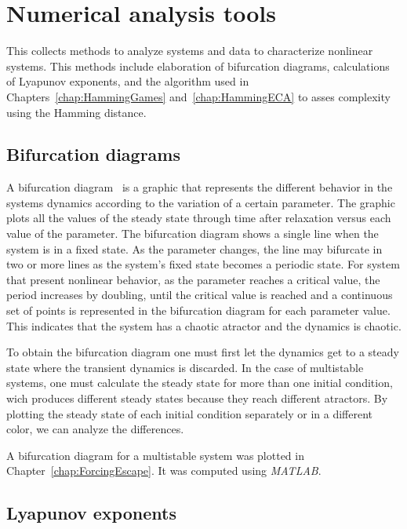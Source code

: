 \section{Numerical analysis tools}

This collects methods to analyze systems and data to characterize nonlinear systems. This methods include elaboration of bifurcation diagrams, calculations of Lyapunov exponents, and the algorithm used in Chapters~\ref{chap:HammingGames} and~\ref{chap:HammingECA} to asses complexity using the Hamming distance.

\subsection{Bifurcation diagrams}

A bifurcation diagram~\cite{Bifurcation} is a graphic that represents the different behavior in the systems dynamics according to the variation of a certain parameter. The graphic plots all the values of the steady state through time after relaxation versus each value of the parameter. The bifurcation diagram shows a single line when the system is in a fixed state. As the parameter changes, the line may bifurcate in two or more lines as the system's fixed state becomes a periodic state. For system that present nonlinear behavior, as the parameter reaches a critical value, the period increases by doubling, until the critical value is reached and a continuous set of points is represented in the bifurcation diagram for each parameter value. This indicates that the system has a chaotic atractor and the dynamics is chaotic.

To obtain the bifurcation diagram one must first let the dynamics get to a steady state where the transient dynamics is discarded. In the case of multistable systems, one must calculate the steady state for more than one initial condition, wich produces different steady states because they reach different atractors. By plotting the steady state of each initial condition separately or in a different color, we can analyze the differences. 

A bifurcation diagram for a multistable system was plotted in Chapter~\ref{chap:ForcingEscape}. It was computed using \textit{MATLAB}. 

\subsection{Lyapunov exponents}

